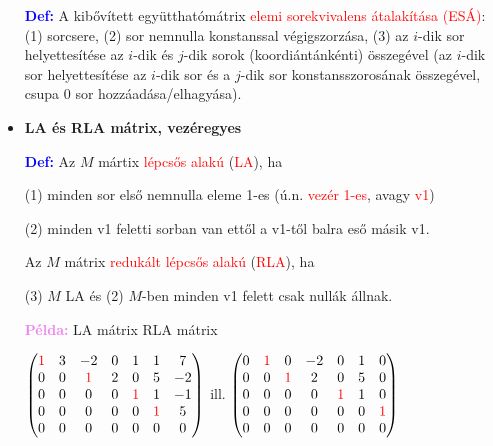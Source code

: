 \documentclass[../../szobeli.tex]{subfiles}
\begin{document}
\begin{itemize}
            \textcolor{blue}{\textbf{Def:}} A kibővített együtthatómátrix \textcolor{red}{elemi sorekvivalens átalakítása (ESÁ)}: (1) sorcsere, (2) sor nemnulla konstanssal végigszorzása, (3) az $i$-dik sor helyettesítése az $i$-dik és $j$-dik sorok (koordiántánkénti) összegével (az $i$-dik sor helyettesítése az $i$-dik sor és a $j$-dik sor konstansszorosának összegével, csupa 0 sor hozzáadása/elhagyása).

        \item \textbf{LA és RLA mátrix, vezéregyes}
        
            \textcolor{blue}{\textbf{Def:}} Az $M$ mártix \textcolor{red}{lépcsős alakú} (\textcolor{red}{LA}), ha 
            
            (1) minden sor első nemnulla eleme 1-es (ú.n. \textcolor{red}{vezér 1-es}, avagy \textcolor{red}{v1}) 

            (2) minden v1 feletti sorban van ettől a v1-től balra eső másik v1.

            Az $M$ mátrix \textcolor{red}{redukált lépcsős alakú} (\textcolor{red}{RLA}), ha 

            (3) $M$ LA és (2) $M$-ben minden v1 felett csak nullák állnak. 

            \textcolor{violet}{\textbf{Példa:}} LA mátrix \hspace{30mm} RLA mátrix

            $ \begin{pmatrix}
                \textcolor{red}{1} & 3 & -2 & 0 & 1 & 1 & 7 \\
                0 & 0 & \textcolor{red}{1} & 2 & 0 & 5 & -2 \\
                0 & 0 & 0 & 0 & \textcolor{red}{1} & 1 & -1 \\
                0 & 0 & 0 & 0 & 0 & \textcolor{red}{1} & 5 \\
                0 & 0 & 0 & 0 & 0 & 0 & 0 
            \end{pmatrix}  $ ill. 
            $ \begin{pmatrix}
                0 & \textcolor{red}{1} & 0 & -2 & 0 & 1 & 0 \\
                0 & 0 & \textcolor{red}{1} & 2 & 0 & 5 & 0 \\
                0 & 0 & 0 & 0 & \textcolor{red}{1} & 1 & 0 \\
                0 & 0 & 0 & 0 & 0 & 0 & \textcolor{red}{1} \\
                0 & 0 & 0 & 0 & 0 & 0 & 0 
                \end{pmatrix}  $


\end{itemize}
\end{document}
